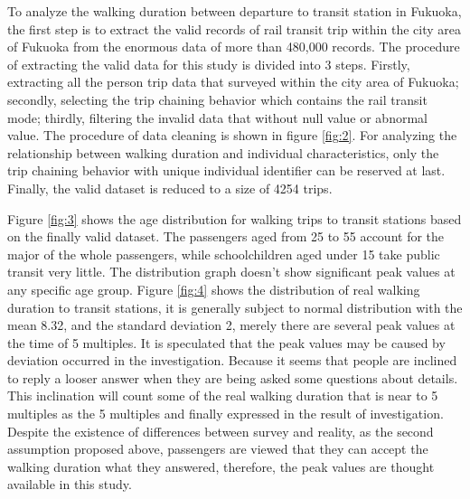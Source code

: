 \documentclass[Journal,letterpaper]{ascelike-new}
\begin{document}
%
To analyze the walking duration between departure to transit station in Fukuoka, the first step is to extract the valid records of rail transit trip within the city area of Fukuoka from the enormous data of more than 480,000 records. The procedure of extracting the valid data for this study is divided into 3 steps. Firstly, extracting all the person trip data that surveyed within the city area of Fukuoka; secondly, selecting the trip chaining behavior which contains the rail transit mode; thirdly, filtering the invalid data that without null value or abnormal value. The procedure of data cleaning is shown in figure \ref{fig:2}. For analyzing the relationship between walking duration and individual characteristics, only the trip chaining behavior with unique individual identifier can be reserved at last. Finally, the valid dataset is reduced to a size of 4254 trips.

%
Figure \ref{fig:3} shows the age distribution for walking trips to transit stations based on the finally valid dataset. The passengers aged from 25 to 55 account for the major of the whole passengers, while schoolchildren aged under 15 take public transit very little. The distribution graph doesn't show significant peak values at any specific age group. Figure \ref{fig:4} shows the distribution of real walking duration to transit stations, it is generally subject to normal distribution with the mean 8.32, and the standard deviation 2, merely there are several peak values at the time of 5 multiples. It is speculated that the peak values may be caused by deviation occurred in the investigation. Because it seems that people are inclined to reply a looser answer when they are being asked some questions about details. This inclination will count some of the real walking duration that is near to 5 multiples as the 5 multiples and finally expressed in the result of investigation. Despite the existence of differences between survey and reality, as the second assumption proposed above, passengers are viewed that they can accept the walking duration what they answered, therefore, the peak values are thought available in this study.

%
\end{document}
